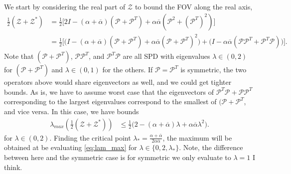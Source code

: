 \documentclass[a4paper,10pt]{article}
\begin{document}
We start by considering the real part of $\mathcal{Z}$ to bound the FOV along the real axis,
%
\begin{align*}
\frac{1}{2}(\mathcal{Z} + \mathcal{Z}^*)
	& = \frac{1}{2}\Big[ 2I - (\alpha + \overline{\alpha})(\mathcal{P}+\mathcal{P}^T) +
		\alpha\overline{\alpha}(\mathcal{P}^2 + (\mathcal{P}^T)^2)\Big] \\
& = \frac{1}{2}\Big[ \Big(I - (\alpha + \overline{\alpha})(\mathcal{P}+\mathcal{P}^T) +
		\alpha\overline{\alpha}(\mathcal{P} + \mathcal{P}^T)^2\Big) +
		\Big(I - \alpha\overline{\alpha}(\mathcal{P}\mathcal{P}^T + \mathcal{P}^T\mathcal{P})\Big) \Big].
\end{align*}
%
Note that $(\mathcal{P}+\mathcal{P}^T)$, $\mathcal{P}\mathcal{P}^T$, and
$\mathcal{P}^T\mathcal{P}$ are all SPD with eigenvalues $\lambda\in(0,2)$
for $(\mathcal{P}+\mathcal{P}^T)$ and $\lambda\in(0,1)$ for the others.
If $\mathcal{P}=\mathcal{P}^T$ is symmetric, the two operators above would
share eigenvectors as well, and we could get tighter bounds. As is, we have
to assume worst case that the eigenvectors of
$\mathcal{P}^T\mathcal{P} + \mathcal{P}\mathcal{P}^T$ corresponding to the
largest eigenvalues correspond to the smallest of $(\mathcal{P}+\mathcal{P}^T$,
and vice versa. In this case, we have bounds 
%
\begin{align}
\lambda_{max}\left(\frac{1}{2}(\mathcal{Z} + \mathcal{Z}^*)\right) & \leq 
	\frac{1}{2}\Big(2 - (\alpha + \overline{\alpha})\lambda +
		\alpha\overline{\alpha}\lambda^2\Big) \label{eq:lam_max}.
\end{align}
%
for $\lambda\in(0,2)$. Finding the critical point $\lambda_* =
\tfrac{\alpha+\overline{\alpha}}{2\alpha\overline{\alpha}}$, the maximum will
be obtained at be evaluating \eqref{eq:lam_max} for $\lambda\in\{0,2,\lambda_*\}$.
Note, the difference between here and the symmetric case is for symmetric we only
evaluate to $\lambda = 1$ I think.
\end{document}
